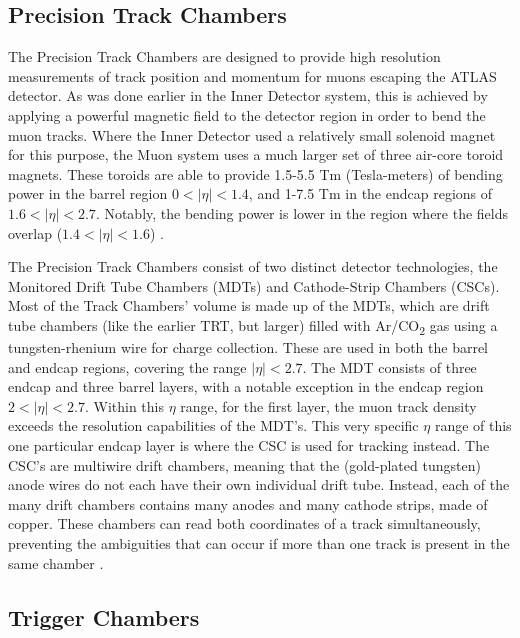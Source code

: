     \subsection{Precision Track Chambers}

        The Precision Track Chambers are designed to provide high resolution measurements of track position and momentum for muons escaping the ATLAS detector. 
        As was done earlier in the Inner Detector system, this is achieved by applying a powerful magnetic field to the detector region in order to bend the muon tracks.
        Where the Inner Detector used a relatively small solenoid magnet for this purpose, the Muon system uses a much larger set of three air-core toroid magnets.
        These toroids are able to provide 1.5-5.5 Tm (Tesla-meters) of bending power in the barrel region $0<|\eta|<1.4$, and 1-7.5 Tm in the endcap regions of $1.6<|\eta|<2.7$.
        Notably, the bending power is lower in the region where the fields overlap ($1.4<|\eta|<1.6$) \cite{atlas_tdr}.

        The Precision Track Chambers consist of two distinct detector technologies, the Monitored Drift Tube Chambers (MDTs) and Cathode-Strip Chambers (CSCs).
        Most of the Track Chambers' volume is made up of the MDTs, which are drift tube chambers (like the earlier TRT, but larger) filled with Ar/CO\textsubscript{2} gas using a tungsten-rhenium wire for charge collection.
        These are used in both the barrel and endcap regions, covering the range $|\eta| < 2.7$.
        The MDT consists of three endcap and three barrel layers, with a notable exception in the endcap region $2 < |\eta| < 2.7$.
        Within this $\eta$ range, for the first layer, the muon track density exceeds the resolution capabilities of the MDT's.
        This very specific $\eta$ range of this one particular endcap layer is where the CSC is used for tracking instead.
        The CSC's are multiwire drift chambers, meaning that the (gold-plated tungsten) anode wires do not each have their own individual drift tube.
        Instead, each of the many drift chambers contains many anodes and many cathode strips, made of copper.
        These chambers can read both coordinates of a track simultaneously, preventing the ambiguities that can occur if more than one track is present in the same chamber \cite{atlas_tdr}.

    \subsection{Trigger Chambers}\label{sec:muon-trigger_chamber}

